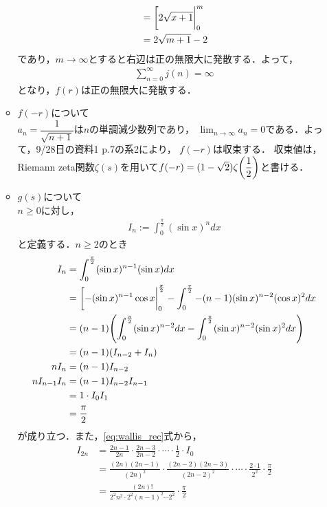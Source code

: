 \begin{enumerate}[(1)]
\begin{itemize}
\begin{align}
            &=\eval[2\sqrt{x+1}|_0^m\\
            &=2\sqrt{m+1}-2
        \end{align}
        であり，$m\to\infty$とすると右辺は正の無限大に発散する．よって，
        \begin{align}
            \sum_{n=0}^\infty j(n)=\infty
        \end{align}
        となり，$f(r)$は正の無限大に発散する．
        \item $f(-r)$について\\
        $a_n=\dfrac{1}{\sqrt{n+1}}$は$n$の単調減少数列であり，
        $\displaystyle\lim_{n\to\infty}a_n=0$である．よって，9/28日の資料1 p.7の系2により，
        $f(-r)$は収束する．
        収束値は，Riemann zeta関数$\zeta(s)$を用いて$f(-r)=(1-\sqrt{2})\zeta\displaystyle\qty(\dfrac{1}{2})$と書ける．
        \item $g(s)$について\\
        $n\ge0$に対し，
        \begin{align}
            I_n := \int_0^\frac{\pi}{2}(\sin x)^ndx
        \end{align}
        と定義する．$n\ge 2$のとき
        \begin{align}
            I_n &= \int_0^\frac{\pi}{2}(\sin x)^{n-1}(\sin x)dx\\
            &=\eval[-(\sin x)^{n-1}\cos x|_0^\frac{\pi}{2}-\int_0^\frac{\pi}{2}-(n-1)(\sin x)^{n-2}(\cos x)^2dx\\
            &=(n-1)\qty(\int_0^\frac{\pi}{2}(\sin x)^{n-2}dx-\int_0^\frac{\pi}{2}(\sin x)^{n-2}(\sin x)^2dx)\\
            &=(n-1)(I_{n-2}+I_n)\\
            nI_n &= (n-1)I_{n-2}\label{eq:wallis_rec}\\
            nI_{n-1}I_n &= (n-1)I_{n-2}I_{n-1}\\
            &=1\cdot I_0I_1\\
            &=\frac{\pi}{2}
        \end{align}
        が成り立つ．また，\eqref{eq:wallis_rec}式から，
        \begin{align}
            I_{2n}
            &=\frac{2n-1}{2n}\cdot\frac{2n-3}{2n-2}\cdot\cdots\cdot\frac{1}{2}\cdot I_0\\
            &=\frac{(2n)(2n-1)}{(2n)^2}\cdot\frac{(2n-2)(2n-3)}{(2n-2)^2}\cdot\cdots\cdot\frac{2\cdot 1}{2^2}\cdot \frac{\pi}{2}\\
            &=\frac{(2n)!}{2^2n^2\cdot 2^2(n-1)^2\cdots 2^2}\cdot \frac{\pi}{2}\\

\end{align}
\end{itemize}
\end{enumerate}
